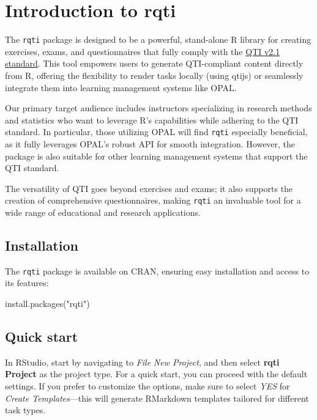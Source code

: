\documentclass[twoside]{tufte-book}
\newenvironment{Shaded}{}{}
\newcommand{\FunctionTok}[1]{\textcolor[rgb]{0.02,0.16,0.49}{#1}}
\newcommand{\NormalTok}[1]{#1}
\newcommand{\StringTok}[1]{\textcolor[rgb]{0.25,0.44,0.63}{#1}}
\begin{document}
\pagestyle{mystyle}
\chapter{Introduction to rqti}\label{introduction-to-rqti}

The \texttt{rqti} package is designed to be a powerful, stand-alone R library for creating exercises, exams, and questionnaires that fully comply with the \href{https://www.imsglobal.org/question/qtiv2p1/imsqti_implv2p1.html}{QTI v2.1 standard}. This tool empowers users to generate QTI-compliant content directly from R, offering the flexibility to render tasks locally (using qtijs) or seamlessly integrate them into learning management systems like OPAL.

Our primary target audience includes instructors specializing in research methods and statistics who want to leverage R's capabilities while adhering to the QTI standard. In particular, those utilizing OPAL will find \texttt{rqti} especially beneficial, as it fully leverages OPAL's robust API for smooth integration. However, the package is also suitable for other learning management systems that support the QTI standard.

The versatility of QTI goes beyond exercises and exams; it also supports the creation of comprehensive questionnaires, making \texttt{rqti} an invaluable tool for a wide range of educational and research applications.

\section{Installation}\label{installation}

The \texttt{rqti} package is available on CRAN, ensuring easy installation and access to its features:

\begin{Shaded}
\begin{Highlighting}[]
\FunctionTok{install.packages}\NormalTok{(}\StringTok{"rqti"}\NormalTok{)}
\end{Highlighting}
\end{Shaded}

\section{Quick start}\label{quick-start}

In RStudio, start by navigating to \emph{File} \textrightarrow{} \emph{New Project}, and then select \textbf{rqti Project} as the project type. For a quick start, you can proceed with the default settings. If you prefer to customize the options, make sure to select \emph{YES} for \emph{Create Templates}---this will generate RMarkdown templates tailored for different task types.
\end{document}
